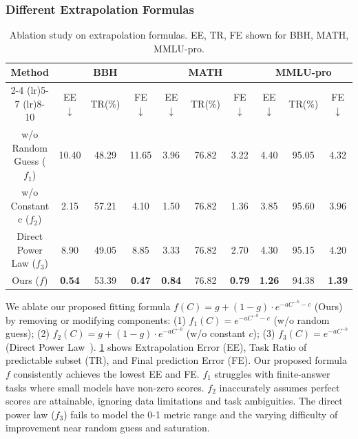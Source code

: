 \subsubsection{Different Extrapolation Formulas}
\label{sec:ablation_extrapolation}
\begin{table}[!t]
\centering
\small
\caption{Ablation study on extrapolation formulas. EE, TR, FE shown for BBH, MATH, MMLU-pro.}
\begin{tabular}{c|ccc|ccc|ccc}
\toprule
\multirow{2}{*}{Method} & \multicolumn{3}{c}{BBH} & \multicolumn{3}{c}{MATH} & \multicolumn{3}{c}{MMLU-pro} \\
\cmidrule(lr){2-4} \cmidrule(lr){5-7} \cmidrule(lr){8-10}
& EE$\downarrow$ & TR(\%) & FE$\downarrow$ & EE$\downarrow$ & TR(\%) & FE$\downarrow$ & EE$\downarrow$ & TR(\%) & FE$\downarrow$ \\
\midrule
w/o Random Guess ($f_1$) & 10.40 & 48.29 & 11.65 & 3.96 & 76.82 & 3.22 & 4.40 & 95.05 & 4.32 \\
w/o Constant c ($f_2$) & 2.15 & 57.21 & 4.10 & 1.50 & 76.82 & 1.36 & 3.85 & 95.60 & 3.96 \\
Direct Power Law ($f_3$) & 8.90 & 49.05 & 8.85 & 3.33 & 76.82 & 2.70 & 4.30 & 95.15 & 4.20 \\
Ours ($f$) & \textbf{0.54} & 53.39 & \textbf{0.47} & \textbf{0.84} & 76.82 & \textbf{0.79} & \textbf{1.26} & 94.38 & \textbf{1.39} \\
\bottomrule
\end{tabular}
\label{tab:ablation_results}
\vspace{-5pt}
\end{table}
We ablate our proposed fitting formula $f(C)=g+(1-g) \cdot e^{-aC^{-b}-c}$ (Ours) by removing or modifying components:
(1) $f_1(C)=e^{-aC^{-b}-c}$ (w/o random guess);
(2) $f_2(C)=g+(1-g) \cdot e^{-aC^{-b}}$ (w/o constant $c$);
(3) $f_3(C) = e^{-aC^{-b}}$ (Direct Power Law~\citep{hu2023predicting}).
\cref{tab:ablation_results} shows Extrapolation Error (EE), Task Ratio of predictable subset (TR), and Final prediction Error (FE).
Our proposed formula $f$ consistently achieves the lowest EE and FE. $f_1$ struggles with finite-answer tasks where small models have non-zero scores. $f_2$ inaccurately assumes perfect scores are attainable, ignoring data limitations and task ambiguities. The direct power law ($f_3$) fails to model the 0-1 metric range and the varying difficulty of improvement near random guess and saturation. 
